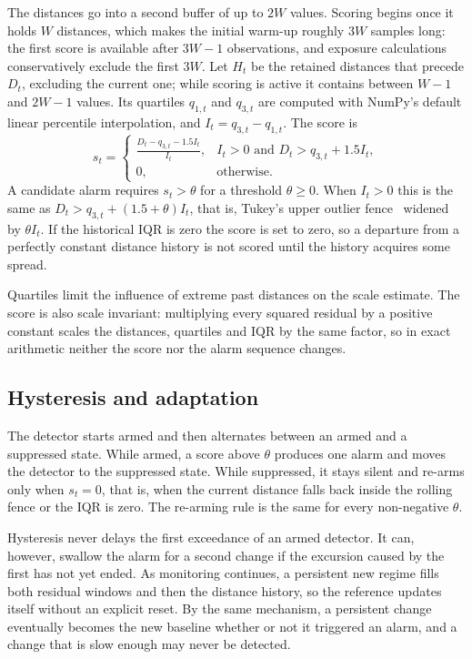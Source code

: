 \documentclass[preprint,12pt]{elsarticle}
\begin{document}
The distances go into a second buffer of up to $2W$ values. Scoring begins once it holds $W$ distances, which makes the initial warm-up roughly $3W$ samples long: the first score is available after $3W-1$ observations, and exposure calculations conservatively exclude the first $3W$. Let $H_t$ be the retained distances that precede $D_t$, excluding the current one; while scoring is active it contains between $W-1$ and $2W-1$ values. Its quartiles $q_{1,t}$ and $q_{3,t}$ are computed with NumPy's default linear percentile interpolation, and $I_t=q_{3,t}-q_{1,t}$. The score is
\begin{equation}\label{eq:score}
s_t=\begin{cases}
\displaystyle\frac{D_t-q_{3,t}-1.5I_t}{I_t},&I_t>0\text{ and }D_t>q_{3,t}+1.5I_t,\\
0,&\text{otherwise}.
\end{cases}
\end{equation}
A candidate alarm requires $s_t>\theta$ for a threshold $\theta\geq0$. When $I_t>0$ this is the same as $D_t>q_{3,t}+(1.5+\theta)I_t$, that is, Tukey's upper outlier fence~\cite{tukey1977exploratory} widened by $\theta I_t$. If the historical IQR is zero the score is set to zero, so a departure from a perfectly constant distance history is not scored until the history acquires some spread.

Quartiles limit the influence of extreme past distances on the scale estimate. The score is also scale invariant: multiplying every squared residual by a positive constant scales the distances, quartiles and IQR by the same factor, so in exact arithmetic neither the score nor the alarm sequence changes.
\subsection{Hysteresis and adaptation}
\label{sec:hysteresis}
The detector starts armed and then alternates between an armed and a suppressed state. While armed, a score above $\theta$ produces one alarm and moves the detector to the suppressed state. While suppressed, it stays silent and re-arms only when $s_t=0$, that is, when the current distance falls back inside the rolling fence or the IQR is zero. The re-arming rule is the same for every non-negative $\theta$.

Hysteresis never delays the first exceedance of an armed detector. It can, however, swallow the alarm for a second change if the excursion caused by the first has not yet ended. As monitoring continues, a persistent new regime fills both residual windows and then the distance history, so the reference updates itself without an explicit reset. By the same mechanism, a persistent change eventually becomes the new baseline whether or not it triggered an alarm, and a change that is slow enough may never be detected.
\end{document}
